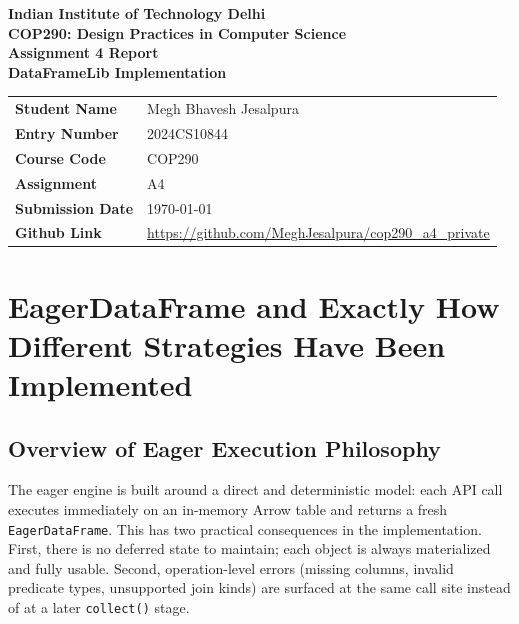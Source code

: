 \documentclass[11pt,a4paper]{article}
\begin{document}
\begin{titlepage}
	\centering
	\vspace*{2.0cm}

	{\Large \textbf{Indian Institute of Technology Delhi}}\\[0.6cm]
	{\large \textbf{COP290: Design Practices in Computer Science}}\\[1.0cm]

	{\Huge \textbf{Assignment 4 Report}}\\[0.35cm]
	{\LARGE \textbf{DataFrameLib Implementation}}\\[2.0cm]

	\renewcommand{\arraystretch}{1.5}
	\begin{tabular}{>{\bfseries}p{5.0cm} p{12.0cm}}
		Student Name & Megh Bhavesh Jesalpura \\
		Entry Number & 2024CS10844 \\
		Course Code & COP290 \\
		Assignment & A4 \\
		Submission Date & \today \\
        Github Link & \url{https://github.com/MeghJesalpura/cop290_a4_private}
	\end{tabular}

	\vfill
	
\end{titlepage}

\tableofcontents
\newpage

\onehalfspacing

\section{EagerDataFrame and Exactly How Different Strategies Have Been Implemented}

\subsection{Overview of Eager Execution Philosophy}
The eager engine is built around a direct and deterministic model: each API call executes immediately on an in-memory Arrow table and returns a fresh \texttt{EagerDataFrame}. This has two practical consequences in the implementation. First, there is no deferred state to maintain; each object is always materialized and fully usable. Second, operation-level errors (missing columns, invalid predicate types, unsupported join kinds) are surfaced at the same call site instead of at a later \texttt{collect()} stage.
\end{document}
